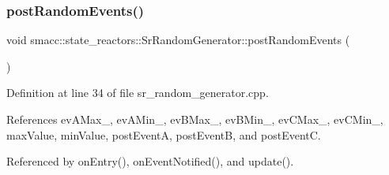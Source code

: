 \subsubsection{\texorpdfstring{post\+Random\+Events()}{postRandomEvents()}}
{\footnotesize\ttfamily void smacc\+::state\+\_\+reactors\+::\+Sr\+Random\+Generator\+::post\+Random\+Events (\begin{DoxyParamCaption}{ }\end{DoxyParamCaption})}



Definition at line 34 of file sr\+\_\+random\+\_\+generator.\+cpp.



References ev\+A\+Max\+\_\+, ev\+A\+Min\+\_\+, ev\+B\+Max\+\_\+, ev\+B\+Min\+\_\+, ev\+C\+Max\+\_\+, ev\+C\+Min\+\_\+, max\+Value, min\+Value, post\+EventA, post\+EventB, and post\+EventC.



Referenced by on\+Entry(), on\+Event\+Notified(), and update().


